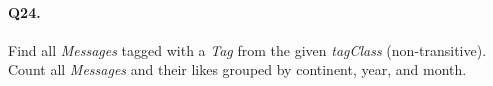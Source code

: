 \paragraph{Q24.}
Find all \emph{Messages} tagged with a \emph{Tag} from the given
\emph{tagClass} (non-transitive).
Count all \emph{Messages} and their likes grouped by continent, year,
and month.
